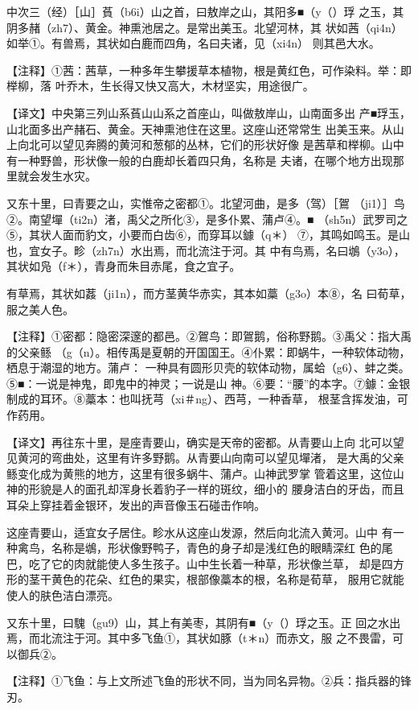 \documentclass[a4paper,12pt,UTF8,twoside]{ctexbook}
\begin{document}
中次三（经）［山］萯（b6i）山之首，曰敖岸之山，其阳多■（y（）琈 之玉，其阴多赭（zh7）、黄金。神熏池居之。是常出美玉。北望河林，其 状如茜（qi4n）如举①。有兽焉，其状如白鹿而四角，名曰夫诸，见（xi4n） 则其邑大水。

【注释】①茜：茜草，一种多年生攀援草本植物，根是黄红色，可作染料。举：即榉柳，落 叶乔木，生长得又快又高大，木材坚实，用途很广。

【译文】中央第三列山系萯山山系之首座山，叫做敖岸山，山南面多出 产■琈玉，山北面多出产赭石、黄金。天神熏池住在这里。这座山还常常生 出美玉来。从山上向北可以望见奔腾的黄河和葱郁的丛林，它们的形状好像 是茜草和榉柳。山中有一种野兽，形状像一般的白鹿却长着四只角，名称是 夫诸，在哪个地方出现那里就会发生水灾。

又东十里，曰青要之山，实惟帝之密都①。北望河曲，是多（驾）［鴐 （ji1）］鸟②。南望墠（ti2n）渚，禹父之所化③，是多仆累、蒲卢④。■ （sh5n）武罗司之⑤，其状人面而豹文，小要而白齿⑥，而穿耳以鐻（q＊） ⑦，其鸣如鸣玉。是山也，宜女子。畛（zh7n）水出焉，而北流注于河。其 中有鸟焉，名曰鴢（y3o），其状如凫（f＊），青身而朱目赤尾，食之宜子。

有草焉，其状如葌（ji1n），而方茎黄华赤实，其本如藁（g3o）本⑧，名 曰荀草，服之美人色。

【注释】①密都：隐密深邃的都邑。②鴐鸟：即鴐鹅，俗称野鹅。③禹父：指大禹的父亲鲧 （g（n）。相传禹是夏朝的开国国王。④仆累：即蜗牛，一种软体动物，栖息于潮湿的地方。蒲卢： 一种具有圆形贝壳的软体动物，属蛤（g6）、蚌之类。⑤■：一说是神鬼，即鬼中的神灵；一说是山 神。⑥要：“腰”的本字。⑦鐻：金银制成的耳环。⑧藁本：也叫抚芎（xi＃ng）、西芎，一种香草， 根茎含挥发油，可作药用。

【译文】再往东十里，是座青要山，确实是天帝的密都。从青要山上向 北可以望见黄河的弯曲处，这里有许多野鹅。从青要山向南可以望见墠渚， 是大禹的父亲鲧变化成为黄熊的地方，这里有很多蜗牛、蒲卢。山神武罗掌 管着这里，这位山神的形貌是人的面孔却浑身长着豹子一样的斑纹，细小的 腰身洁白的牙齿，而且耳朵上穿挂着金银环，发出的声音像玉石碰击作响。

这座青要山，适宜女子居住。畛水从这座山发源，然后向北流入黄河。山中 有一种禽鸟，名称是鴢，形状像野鸭子，青色的身子却是浅红色的眼睛深红 色的尾巴，吃了它的肉就能使人多生孩子。山中生长着一种草，形状像兰草， 却是四方形的茎干黄色的花朵、红色的果实，根部像藁本的根，名称是荀草， 服用它就能使人的肤色洁白漂亮。

又东十里，曰騩（gu9）山，其上有美枣，其阴有■（y（）琈之玉。正 回之水出焉，而北流注于河。其中多飞鱼①，其状如豚（t＊n）而赤文，服 之不畏雷，可以御兵②。

【注释】①飞鱼：与上文所述飞鱼的形状不同，当为同名异物。②兵：指兵器的锋刃。
\end{document}
